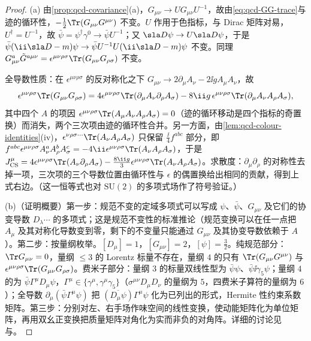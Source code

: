 \begin{proof}
(a) 由\cref{prop:qcd-covariance}(a)，$G_{\mu\nu}\to UG_{\mu\nu}U^{-1}$，故由\cref{eq:qcd-GG-trace}与迹的循环性，$-\frac12\Tr(G_{\mu\nu}G^{\mu\nu})$ 不变。$U$ 作用于色指标，与 Dirac 矩阵对易，$U^\dagger=U^{-1}$，故 $\bar\psi=\psi^\dagger\gamma^0\to\bar\psi U^{-1}$；又 $\sla D\psi\to U\sla D\psi$，于是 $\bar\psi(\ii\sla D-m)\psi\to\bar\psi U^{-1}U(\ii\sla D-m)\psi$ 不变。同理 $G^a_{\mu\nu}\tilde G^{a\mu\nu}=\epsilon^{\mu\nu\rho\sigma}\Tr(G_{\mu\nu}G_{\rho\sigma})$ 不变。

全导数性质：在 $\epsilon^{\mu\nu\rho\sigma}$ 的反对称化之下 $G_{\mu\nu}\to2\partial_\mu A_\nu-2\ii gA_\mu A_\nu$，故
\[
\epsilon^{\mu\nu\rho\sigma}\Tr(G_{\mu\nu}G_{\rho\sigma})=4\epsilon^{\mu\nu\rho\sigma}\Tr(\partial_\mu A_\nu\partial_\rho A_\sigma)-8\ii g\,\epsilon^{\mu\nu\rho\sigma}\Tr(\partial_\mu A_\nu A_\rho A_\sigma),
\]
其中四个 $A$ 的项因 $\epsilon^{\mu\nu\rho\sigma}\Tr(A_\mu A_\nu A_\rho A_\sigma)=0$（迹的循环移动是四个指标的奇置换）而消失，两个三次项由迹的循环性合并。另一方面，由\cref{lem:qcd-colour-identities}(iv)，$\epsilon^{\nu\rho\sigma\cdots}\Tr(A_\nu A_\rho A_\sigma)$ 只保留 $\frac{\ii}4f^{abc}$ 部分，即 $f^{abc}\epsilon^{\mu\nu\rho\sigma}A^a_\nu A^b_\rho A^c_\sigma=-4\ii\epsilon^{\mu\nu\rho\sigma}\Tr(A_\nu A_\rho A_\sigma)$，于是 $J^\mu_{\mathrm{CS}}=4\epsilon^{\mu\nu\rho\sigma}\Tr(A_\nu\partial_\rho A_\sigma)-\frac{8\ii g}3\epsilon^{\mu\nu\rho\sigma}\Tr(A_\nu A_\rho A_\sigma)$。求散度：$\partial_\mu\partial_\rho$ 的对称性去掉一项，三次项的三个导数位置由循环性与 $\epsilon$ 的偶置换给出相同的贡献，得到上式右边。（这一恒等式也对 $\mathrm{SU}(2)$ 的多项式场作了符号验证。）%

(b)（证明概要）第一步：规范不变的定域多项式可以写成 $\psi$、$\bar\psi$、$G_{\mu\nu}$ 及它们的协变导数 $D_\lambda\cdots$ 的多项式；这是规范不变性的标准推论（规范变换可以在任一点把 $A_\mu$ 及其对称化导数变到零，剩下的不变量只能通过 $G_{\mu\nu}$ 及其协变导数依赖于 $A$）。第二步：按量纲枚举。$[D_\mu]=1$，$[G_{\mu\nu}]=2$，$[\psi]=\frac32$。纯规范部分：$\Tr G_{\mu\nu}=0$，量纲 $\le3$ 的 Lorentz 标量不存在，量纲 $4$ 的只有 $\Tr(G_{\mu\nu}G^{\mu\nu})$ 与 $\epsilon^{\mu\nu\rho\sigma}\Tr(G_{\mu\nu}G_{\rho\sigma})$。费米子部分：量纲 $3$ 的标量双线性型为 $\bar\psi\psi$、$\bar\psi\ii\gamma_5\psi$；量纲 $4$ 的为 $\bar\psi\Gamma^\mu D_\mu\psi$，$\Gamma^\mu\in\{\gamma^\mu,\gamma^\mu\gamma_5\}$（$\sigma^{\mu\nu}D_\mu D_\nu$ 的量纲为 $5$，四费米子算符的量纲为 $6$）；全导数 $\partial_\mu(\bar\psi\Gamma^\mu\psi)$ 把 $(\overline{D_\mu\psi})\Gamma^\mu\psi$ 化为已列出的形式，Hermite 性约束系数矩阵。第三步：分别对左、右手场作味空间的线性变换，使动能矩阵化为单位矩阵，再用双幺正变换把质量矩阵对角化为实而非负的对角阵。详细的讨论见\cite[第~15~章]{Weinberg1996}与\cite[第~15~章]{PeskinSchroeder1995}。
\end{proof}


